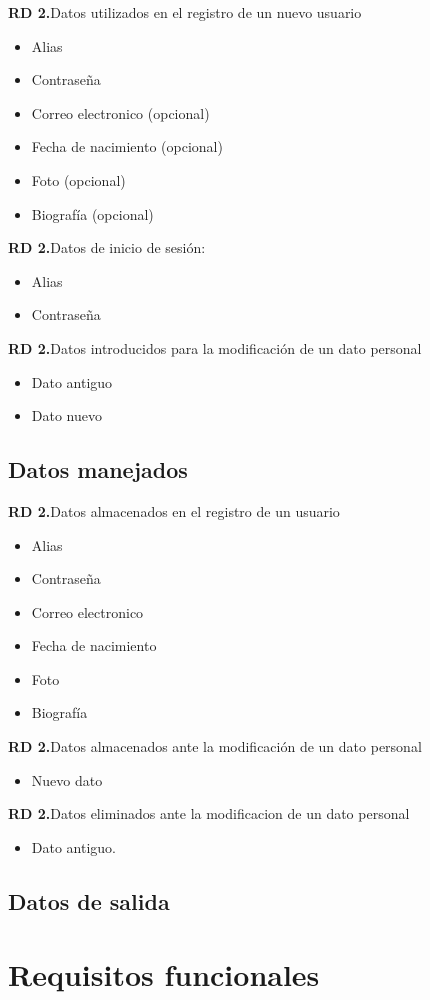 \documentclass[
  12pt,
  a4paper,
  DIV=12,
  spanish,
]{scrartcl}
\newcounter{RDdCounter} %
\newcommand{\rdd}[1]{\addtocounter{RDdCounter}{1}\textbf{\rmfamily RD 2.\theRDdCounter}\quad#1\\}
\begin{document}
\rdd{Datos utilizados en el registro de un nuevo usuario}
\begin{itemize}
\item Alias
\item Contraseña
\item Correo electronico (opcional)
\item Fecha de nacimiento (opcional)
\item Foto (opcional)
\item Biografía (opcional)
\end{itemize}
\rdd{Datos de inicio de sesión:}
\begin{itemize}
\item Alias
\item Contraseña
\end{itemize}
\rdd{Datos introducidos para la modificación de un dato personal}
\begin{itemize}
\item Dato antiguo
\item Dato nuevo
\end{itemize}

\subsection{Datos manejados}
\rdd{Datos almacenados en el registro de un usuario}
\begin{itemize}
\item Alias
\item Contraseña
\item Correo electronico
\item Fecha de nacimiento
\item Foto
\item Biografía
\end{itemize}
\rdd{Datos almacenados ante la modificación de un dato personal}
\begin{itemize}
\item Nuevo dato
\end{itemize}
\rdd{Datos eliminados ante la modificacion de un dato personal}
\begin{itemize}
\item Dato antiguo.
\end{itemize}

\subsection{Datos de salida}

\section{Requisitos funcionales}
\end{document}

